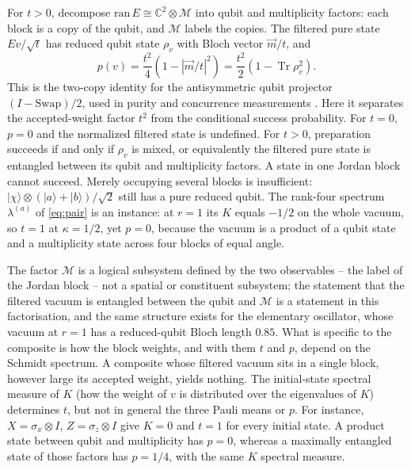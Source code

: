 \documentclass[11pt,a4paper]{article}
\newcommand{\Tr}{\operatorname{Tr}}
\newcommand{\ket}[1]{|#1\rangle}
\begin{document}
For $t>0$, decompose $\mathrm{ran}\,E\cong\mathbb C^2\otimes\mathcal M$ into qubit and multiplicity factors: each block is a copy of the qubit, and $\mathcal M$ labels the copies. The filtered pure state $Ev/\sqrt t$ has reduced qubit state $\rho_v$ with Bloch vector $\vec m/t$, and
\begin{equation}
p(v)=\frac{t^2}{4}\left(1-|\vec m/t|^2\right)
=\frac{t^2}{2}\left(1-\Tr\rho_v^2\right).
\label{eq:mixed}
\end{equation}
This is the two-copy identity for the antisymmetric qubit projector $(I-\mathrm{Swap})/2$, used in purity and concurrence measurements \cite{Walborn2007}. Here it separates the accepted-weight factor $t^2$ from the conditional success probability. For $t=0$, $p=0$ and the normalized filtered state is undefined. For $t>0$, preparation succeeds if and only if $\rho_v$ is mixed, or equivalently the filtered pure state is entangled between its qubit and multiplicity factors. A state in one Jordan block cannot succeed. Merely occupying several blocks is insufficient: $\ket\chi\otimes(\ket a+\ket b)/\sqrt2$ still has a pure reduced qubit. The rank-four spectrum $\lambda^{(a)}$ of \eqref{eq:pair} is an instance: at $r=1$ its $K$ equals $-1/2$ on the whole vacuum, so $t=1$ at $\kappa=1/2$, yet $p=0$, because the vacuum is a product of a qubit state and a multiplicity state across four blocks of equal angle.

The factor $\mathcal M$ is a logical subsystem defined by the two observables -- the label of the Jordan block -- not a spatial or constituent subsystem; the statement that the filtered vacuum is entangled between the qubit and $\mathcal M$ is a statement in this factorisation, and the same structure exists for the elementary oscillator, whose vacuum at $r=1$ has a reduced-qubit Bloch length $0.85$. What is specific to the composite is how the block weights, and with them $t$ and $p$, depend on the Schmidt spectrum. A composite whose filtered vacuum sits in a single block, however large its accepted weight, yields nothing. The initial-state spectral measure of $K$ (how the weight of $v$ is distributed over the eigenvalues of $K$) determines $t$, but not in general the three Pauli means or $p$. For instance, $X=\sigma_x\otimes I$, $Z=\sigma_z\otimes I$ give $K=0$ and $t=1$ for every initial state. A product state between qubit and multiplicity has $p=0$, whereas a maximally entangled state of those factors has $p=1/4$, with the same $K$ spectral measure.
\end{document}
